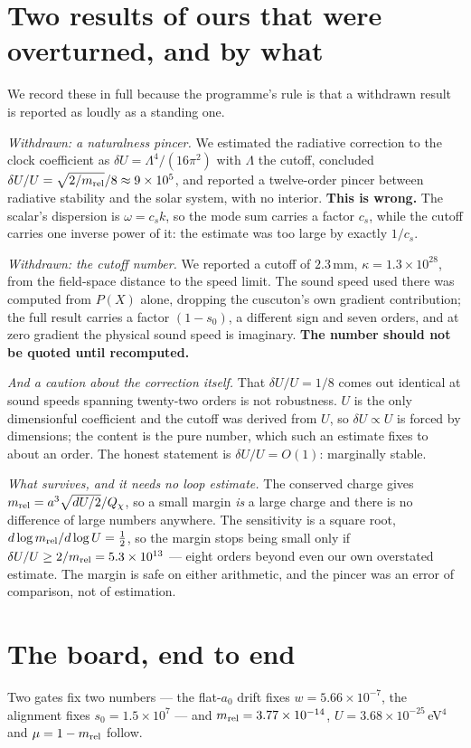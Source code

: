 \documentclass[11pt,letterpaper]{article}
\begin{document}
\section{Two results of ours that were overturned, and by what}
We record these in full because the programme's rule is that a withdrawn result is reported as loudly as a standing one.

\emph{Withdrawn: a naturalness pincer.} We estimated the radiative correction to the clock coefficient as $\delta U=\Lambda^4/(16\pi^2)$ with $\Lambda$ the cutoff, concluded $\delta U/U=\sqrt{2/m_{\rm rel}}/8\approx9\times10^5$, and reported a twelve-order pincer between radiative stability and the solar system, with no interior. \textbf{This is wrong.} The scalar's dispersion is $\omega=c_sk$, so the mode sum carries a factor $c_s$, while the cutoff carries one inverse power of it: the estimate was too large by exactly $1/c_s$.

\emph{Withdrawn: the cutoff number.} We reported a cutoff of $2.3\,$mm, $\kappa=1.3\times10^{28}$, from the field-space distance to the speed limit. The sound speed used there was computed from $P(X)$ alone, dropping the cuscuton's own gradient contribution; the full result \cite{paper17} carries a factor $(1-s_0)$, a different sign and seven orders, and at zero gradient the physical sound speed is imaginary. \textbf{The number should not be quoted until recomputed.}

\emph{And a caution about the correction itself.} That $\delta U/U=1/8$ comes out identical at sound speeds spanning twenty-two orders is not robustness. $U$ is the only dimensionful coefficient and the cutoff was derived from $U$, so $\delta U\propto U$ is forced by dimensions; the content is the pure number, which such an estimate fixes to about an order. The honest statement is $\delta U/U=O(1)$: marginally stable.

\emph{What survives, and it needs no loop estimate.} The conserved charge gives $m_{\rm rel}=a^3\sqrt{dU/2}/Q_\chi$, so a small margin \emph{is} a large charge and there is no difference of large numbers anywhere. The sensitivity is a square root, $d\log m_{\rm rel}/d\log U=\tfrac12$, so the margin stops being small only if $\delta U/U\ge2/m_{\rm rel}=5.3\times10^{13}$ --- eight orders beyond even our own overstated estimate. The margin is safe on either arithmetic, and the pincer was an error of comparison, not of estimation.

\section{The board, end to end}
Two gates fix two numbers --- the flat-$a_0$ drift fixes $w=5.66\times10^{-7}$, the alignment fixes $s_0=1.5\times10^7$ --- and $m_{\rm rel}=3.77\times10^{-14}$, $U=3.68\times10^{-25}\,$eV$^4$ and $\mu=1-m_{\rm rel}$ follow.
\end{document}
